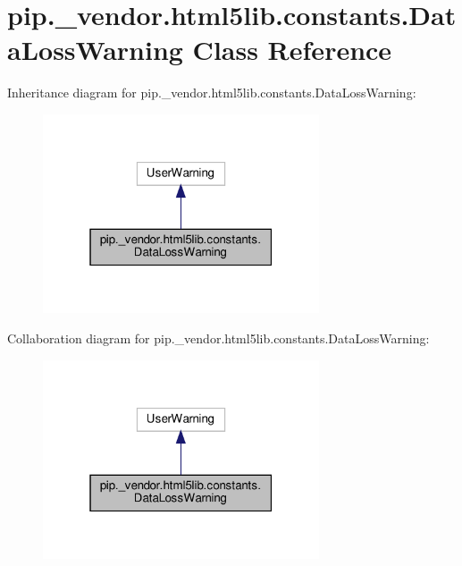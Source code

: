 \hypertarget{classpip_1_1__vendor_1_1html5lib_1_1constants_1_1DataLossWarning}{}\section{pip.\+\_\+vendor.\+html5lib.\+constants.\+Data\+Loss\+Warning Class Reference}
\label{classpip_1_1__vendor_1_1html5lib_1_1constants_1_1DataLossWarning}


Inheritance diagram for pip.\+\_\+vendor.\+html5lib.\+constants.\+Data\+Loss\+Warning\+:
\nopagebreak
\begin{figure}[H]
\begin{center}
\leavevmode
\includegraphics[width=232pt]{classpip_1_1__vendor_1_1html5lib_1_1constants_1_1DataLossWarning__inherit__graph}
\end{center}
\end{figure}


Collaboration diagram for pip.\+\_\+vendor.\+html5lib.\+constants.\+Data\+Loss\+Warning\+:
\nopagebreak
\begin{figure}[H]
\begin{center}
\leavevmode
\includegraphics[width=232pt]{classpip_1_1__vendor_1_1html5lib_1_1constants_1_1DataLossWarning__coll__graph}
\end{center}
\end{figure}


